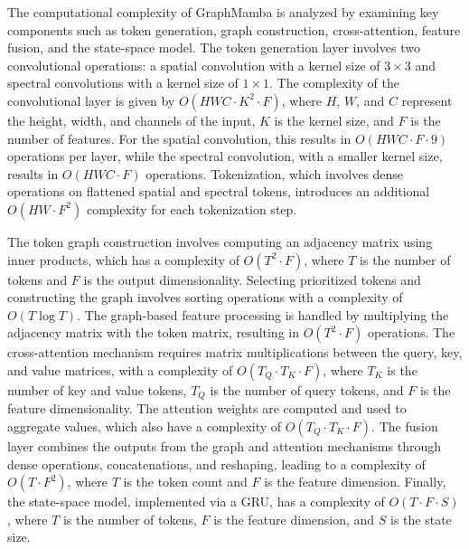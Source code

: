 \documentclass[journal]{IEEEtran}
\begin{document}
The computational complexity of GraphMamba is analyzed by examining key components such as token generation, graph construction, cross-attention, feature fusion, and the state-space model. The token generation layer involves two convolutional operations: a spatial convolution with a kernel size of $3 \times 3$ and spectral convolutions with a kernel size of $1 \times 1$. The complexity of the convolutional layer is given by $O(HWC \cdot K^2 \cdot F)$, where $H$, $W$, and $C$ represent the height, width, and channels of the input, $K$ is the kernel size, and $F$ is the number of features. For the spatial convolution, this results in $O(HWC \cdot F \cdot 9)$ operations per layer, while the spectral convolution, with a smaller kernel size, results in $O(HWC \cdot F)$ operations. Tokenization, which involves dense operations on flattened spatial and spectral tokens, introduces an additional $O(HW \cdot F^2)$ complexity for each tokenization step.

The token graph construction involves computing an adjacency matrix using inner products, which has a complexity of $O(T^2 \cdot F)$, where $T$ is the number of tokens and $F$ is the output dimensionality. Selecting prioritized tokens and constructing the graph involves sorting operations with a complexity of $O(T \log T)$. The graph-based feature processing is handled by multiplying the adjacency matrix with the token matrix, resulting in $O(T^2 \cdot F)$ operations. The cross-attention mechanism requires matrix multiplications between the query, key, and value matrices, with a complexity of $O(T_Q \cdot T_K \cdot F)$, where $T_K$ is the number of key and value tokens, $T_Q$ is the number of query tokens, and $F$ is the feature dimensionality. The attention weights are computed and used to aggregate values, which also have a complexity of $O(T_Q \cdot T_K \cdot F)$. The fusion layer combines the outputs from the graph and attention mechanisms through dense operations, concatenations, and reshaping, leading to a complexity of $O(T \cdot F^2)$, where $T$ is the token count and $F$ is the feature dimension. Finally, the state-space model, implemented via a GRU, has a complexity of $O(T \cdot F \cdot S)$, where $T$ is the number of tokens, $F$ is the feature dimension, and $S$ is the state size.

\end{document}
